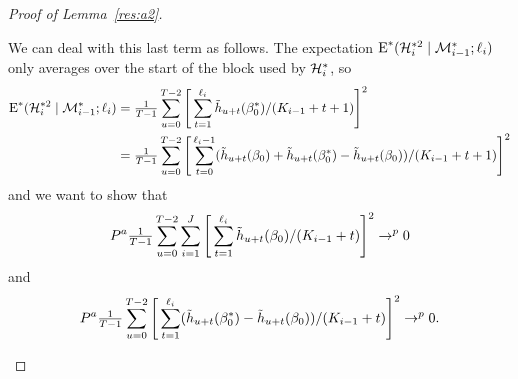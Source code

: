 \documentclass[12pt,fleqn]{article}
\begin{document}
\begin{proof}[Proof of Lemma~\ref{res:a2}]
\begin{enumerate}
    We can deal with this last term as follows. The expectation
    $\operatorname{E}^*(\mathcal{H}_i^{*2} \mid \mathcal{M}_{i-1}^*; \ell_i)$ only averages over the
    start of the block used by $\mathcal{H}_i^*$, so
    \begin{align*}
      \operatorname{E}^*(\mathcal{H}_i^{*2} \mid \mathcal{M}_{i-1}^*; \ell_i)
      &= \tfrac{1}{T-1} \sum_{u = 0}^{T-2} \Bigg[\sum_{t = 1}^{\ell_{i}} \tilde{h}_{u + t}(\beta_0^*) / (K_{i-1} + t + 1)\Bigg]^2 \\
      &= \tfrac{1}{T-1} \sum_{u = 0}^{T-2} \Bigg[\sum_{t = 0}^{\ell_{i}-1}
      (\tilde{h}_{u + t}(\beta_0) + \tilde{h}_{u + t}(\beta_0^*) - \tilde{h}_{u + t}(\beta_0))/ (K_{i-1} + t + 1)\Bigg]^2
    \end{align*}
    and we want to show that
    \begin{equation}\label{eq:4}
      P^a \tfrac{1}{T-1} \sum_{u = 0}^{T-2} \sum_{i=1}^J \Bigg[\sum_{t = 1}^{\ell_{i}}
      \tilde{h}_{u + t}(\beta_0)/ (K_{i-1} + t)\Bigg]^2 \to^p 0
    \end{equation}
    and
    \begin{equation}\label{eq:5}
      P^a \tfrac{1}{T-1} \sum_{u = 0}^{T-2} \Bigg[\sum_{t = 1}^{\ell_{i}}
      (\tilde{h}_{u + t}(\beta_0^*) - \tilde{h}_{u + t}(\beta_0))/ (K_{i-1} + t)\Bigg]^2
      \to^p 0.
    \end{equation}


\end{enumerate}
\end{proof}
\end{document}
